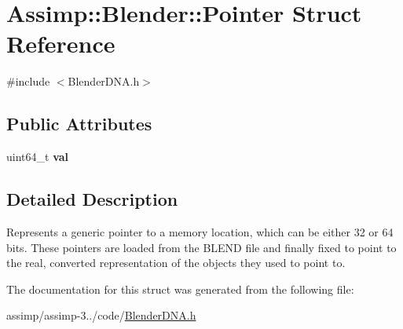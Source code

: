 \hypertarget{struct_assimp_1_1_blender_1_1_pointer}{\section{Assimp\+:\+:Blender\+:\+:Pointer Struct Reference}
\label{struct_assimp_1_1_blender_1_1_pointer}
}


{\ttfamily \#include $<$Blender\+D\+N\+A.\+h$>$}

\subsection*{Public Attributes}
\begin{DoxyCompactItemize}
\item 
\hypertarget{struct_assimp_1_1_blender_1_1_pointer_ad37095daa04fb39cf51f715d0205d17f}{uint64\+\_\+t {\bfseries val}}\label{struct_assimp_1_1_blender_1_1_pointer_ad37095daa04fb39cf51f715d0205d17f}

\end{DoxyCompactItemize}


\subsection{Detailed Description}
Represents a generic pointer to a memory location, which can be either 32 or 64 bits. These pointers are loaded from the B\+L\+E\+N\+D file and finally fixed to point to the real, converted representation of the objects they used to point to. 

The documentation for this struct was generated from the following file\+:\begin{DoxyCompactItemize}
\item 
assimp/assimp-\/3../code/\hyperlink{_blender_d_n_a_8h}{Blender\+D\+N\+A.\+h}\end{DoxyCompactItemize}
